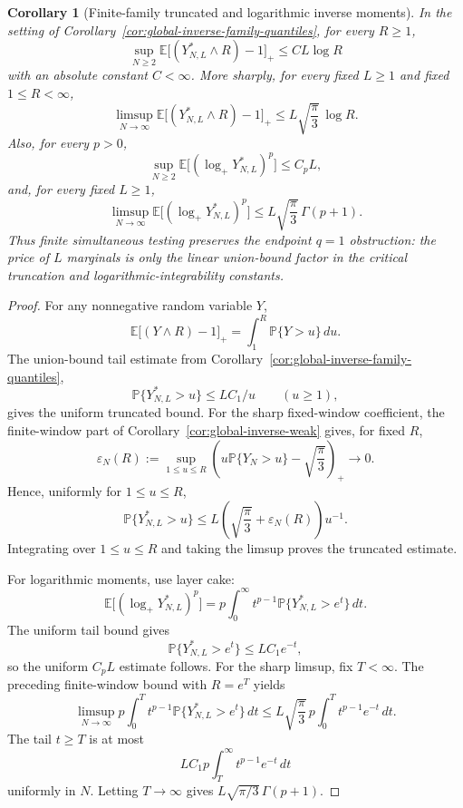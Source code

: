 \documentclass[11pt]{amsart}
\numberwithin{equation}{section}
\newtheorem{corollary}[theorem]{Corollary}
\theoremstyle{definition}
\theoremstyle{remark}
\newcommand{\Prob}{\mathbb P}
\newcommand{\Exp}{\mathbb E}
\begin{document}
\begin{corollary}[Finite-family truncated and logarithmic inverse moments]
\label{cor:global-inverse-family-moments}
In the setting of Corollary~\ref{cor:global-inverse-family-quantiles}, for
every \(R\ge1\),
\[
  \sup_{N\ge2}\Exp\bigl[(Y_{N,L}^*\wedge R)-1\bigr]_+
  \le C L\log R
\]
with an absolute constant \(C<\infty\).  More sharply, for every fixed
\(L\ge1\) and fixed \(1\le R<\infty\),
\[
  \limsup_{N\to\infty}
  \Exp\bigl[(Y_{N,L}^*\wedge R)-1\bigr]_+
  \le L\sqrt{\frac{\pi}{3}}\,\log R .
\]
Also, for every \(p>0\),
\[
  \sup_{N\ge2}\Exp\bigl[(\log_+Y_{N,L}^*)^p\bigr]
  \le C_p L,
\]
and, for every fixed \(L\ge1\),
\[
  \limsup_{N\to\infty}\Exp\bigl[(\log_+Y_{N,L}^*)^p\bigr]
  \le L\sqrt{\frac{\pi}{3}}\,\Gamma(p+1).
\]
Thus finite simultaneous testing preserves the endpoint \(q=1\) obstruction:
the price of \(L\) marginals is only the linear union-bound factor in the
critical truncation and logarithmic-integrability constants.
\end{corollary}

\begin{proof}
For any nonnegative random variable \(Y\),
\[
  \Exp\bigl[(Y\wedge R)-1\bigr]_+
  =\int_1^R\Prob\{Y>u\}\,du .
\]
The union-bound tail estimate from
Corollary~\ref{cor:global-inverse-family-quantiles},
\[
  \Prob\{Y_{N,L}^*>u\}\le LC_1/u\qquad(u\ge1),
\]
gives the uniform truncated bound.  For the sharp fixed-window coefficient, the
finite-window part of Corollary~\ref{cor:global-inverse-weak} gives, for fixed
\(R\),
\[
  \varepsilon_N(R):=
  \sup_{1\le u\le R}
  \left(u\Prob\{Y_N>u\}-\sqrt{\frac{\pi}{3}}\right)_+
  \longrightarrow0 .
\]
Hence, uniformly for \(1\le u\le R\),
\[
  \Prob\{Y_{N,L}^*>u\}
  \le L\left(\sqrt{\frac{\pi}{3}}+\varepsilon_N(R)\right)u^{-1}.
\]
Integrating over \(1\le u\le R\) and taking the limsup proves the truncated
estimate.

For logarithmic moments, use layer cake:
\[
  \Exp\bigl[(\log_+Y_{N,L}^*)^p\bigr]
  =
  p\int_0^\infty t^{p-1}\Prob\{Y_{N,L}^*>e^t\}\,dt .
\]
The uniform tail bound gives
\[
  \Prob\{Y_{N,L}^*>e^t\}\le LC_1 e^{-t},
\]
so the uniform \(C_pL\) estimate follows.  For the sharp limsup, fix
\(T<\infty\).  The preceding finite-window bound with \(R=e^T\) yields
\[
  \limsup_{N\to\infty}
  p\int_0^T t^{p-1}\Prob\{Y_{N,L}^*>e^t\}\,dt
  \le
  L\sqrt{\frac{\pi}{3}}\,
  p\int_0^T t^{p-1}e^{-t}\,dt .
\]
The tail \(t\ge T\) is at most
\[
  LC_1p\int_T^\infty t^{p-1}e^{-t}\,dt
\]
uniformly in \(N\).  Letting \(T\to\infty\) gives
\(L\sqrt{\pi/3}\,\Gamma(p+1)\).
\end{proof}
\end{document}
